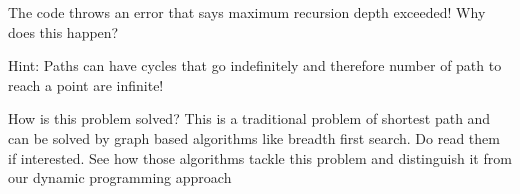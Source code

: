 \documentclass[11pt]{article}
\begin{document}
The code throws an error that says maximum recursion depth exceeded! Why
does this happen?

Hint: Paths can have cycles that go indefinitely and therefore number of
path to reach a point are infinite!

How is this problem solved? This is a traditional problem of shortest
path and can be solved by graph based algorithms like breadth first
search. Do read them if interested. See how those algorithms tackle this
problem and distinguish it from our dynamic programming approach


    
    
    
    
\end{document}
